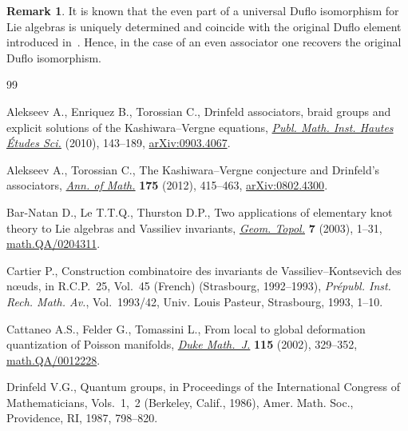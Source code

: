 \documentclass[10pt,a4paper]{amsart}
\numberwithin{equation}{section}
\theoremstyle{definition}
\newtheorem{rmk}[thm]{Remark}
\begin{document}
\begin{rmk}
It is known that the even part of a universal Duf\/lo isomorphism for Lie algebras is uniquely determined and coincide with the original Duf\/lo element introduced in~\cite{Duflo1977}. Hence, in the case of an even associator one recovers the original Duf\/lo isomorphism.
\end{rmk}


\begin{thebibliography}{99}
\footnotesize\itemsep=0pt

Alekseev A., Enriquez B., Torossian C., Drinfeld associators, braid groups and
 explicit solutions of the {K}ashiwara--{V}ergne equations, \href{http://dx.doi.org/10.1007/s10240-010-0029-4}{\textit{Publ.
 Math. Inst. Hautes \'Etudes Sci.}} (2010), 143--189, \href{http://arxiv.org/abs/0903.4067}{arXiv:0903.4067}.

Alekseev A., Torossian C., The {K}ashiwara--{V}ergne conjecture and
 {D}rinfeld's associators, \href{http://dx.doi.org/10.4007/annals.2012.175.2.1}{\textit{Ann. of Math.}} \textbf{175} (2012),
 415--463, \href{http://arxiv.org/abs/0802.4300}{arXiv:0802.4300}.

Bar-Natan D., Le T.T.Q., Thurston D.P., Two applications of elementary knot
 theory to {L}ie algebras and {V}assiliev invariants, \href{http://dx.doi.org/10.2140/gt.2003.7.1}{\textit{Geom. Topol.}}
 \textbf{7} (2003), 1--31, \href{http://arxiv.org/abs/math.QA/0204311}{math.QA/0204311}.

Cartier P., Construction combinatoire des invariants de
 {V}assiliev--{K}ontsevich des n\oe uds, in R.{C}.{P}.~25, {V}ol.~45
 ({F}rench) ({S}trasbourg, 1992--1993), \textit{Pr\'epubl. Inst. Rech. Math.
 Av.}, Vol.~1993/42, Univ. Louis Pasteur, Strasbourg, 1993, 1--10.

Cattaneo A.S., Felder G., Tomassini L., From local to global deformation
 quantization of {P}oisson manifolds, \href{http://dx.doi.org/10.1215/S0012-7094-02-11524-5}{\textit{Duke Math.~J.}} \textbf{115}
 (2002), 329--352, \href{http://arxiv.org/abs/math.QA/0012228}{math.QA/0012228}.

Drinfeld V.G., Quantum groups, in Proceedings of the {I}nternational {C}ongress
 of {M}athematicians, {V}ols.~1,~2 ({B}erkeley, {C}alif., 1986), Amer. Math.
 Soc., Providence, RI, 1987, 798--820.


\end{thebibliography}
\end{document}
